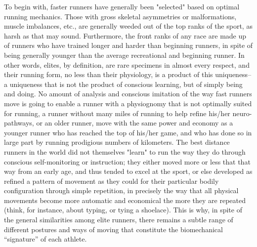 To begin with, faster runners have generally been "selected" based on optimal running mechanics. Those with gross skeletal asymmetries or malformations, muscle imbalances, etc., are generally weeded out of the top ranks of the sport, as harsh as that may sound. Furthermore, the front ranks of any race are made up of runners who have trained longer and harder than beginning runners, in spite of being generally younger than the average recreational and beginning runner. In other words, elites, by definition, are rare specimens in almost every respect, and their running form, no less than their physiology, is a product of this uniqueness-- a uniqueness that is not the product of conscious learning, but of simply being and doing. No amount of analysis and conscious imitation of the way fast runners move is going to enable a runner with a physiognomy that is not optimally suited for running, a runner without many miles of running to help refine his/her neuro-pathways, or an older runner, move with the same power and economy as a younger runner who has reached the top of his/her game, and who has done so in large part by running prodigious numbers of kilometers. The best distance runners in the world did not themselves "learn" to run the way they do through conscious self-monitoring or instruction; they either moved more or less that that way from an early age, and thus tended to excel at the sport, or else developed as refined a pattern of movement as they could for their particular bodily configuration through simple repetition, in precisely the way that all physical movements become more automatic and economical the more they are repeated (think, for instance, about typing, or tying a shoelace). This is why, in spite of the general similarities among elite runners, there remains a subtle range of different postures and ways of moving that constitute the biomechanical “signature” of each athlete.

